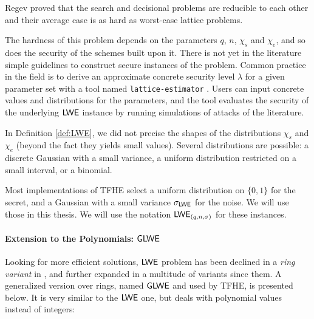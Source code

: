 Regev proved that the search and decisional problems are reducible to each other and their average case is as hard as worst-case lattice problems.

The hardness of this problem depends on the parameters $q$, $n$, $\chi_s$ and $\chi_e$, and so does the security of the schemes built upon it. There is not yet in the literature simple guidelines to construct secure instances of the problem. Common practice in the field is to derive an approximate concrete security level $\lambda$ for a given parameter set with a tool named \texttt{lattice-estimator} \cite{lattice-estimator}. Users can input concrete values and distributions for the parameters, and the tool evaluates the security of the underlying $\textsf{LWE}$ instance by running simulations of attacks of the literature.

In Definition \ref{def:LWE}, we did not precise the shapes of the distributions $\chi_s$ and $\chi_e$ (beyond the fact they yields small values). Several distributions are possible: a discrete Gaussian with a small variance, a uniform distribution restricted on a small interval, or a binomial. 

Most implementations of TFHE select a uniform distribution on $\{0, 1\}$ for the secret, and a Gaussian with a small variance $\sigma_{\textsf{LWE}}$ for the noise. We will use those in this thesis. We will use the notation $\textsf{LWE}_{(q, n, \sigma)}$ for these instances.



\paragraph{Extension to the Polynomials: $\textsf{GLWE}$}


Looking for more efficient solutions, $\textsf{LWE}$ problem has been declined in a \textit{ring variant} in \cite{rlwe}, and further expanded in a multitude of variants since them. A generalized version over rings, named $\textsf{GLWE}$ and used by TFHE, is presented below. It is very similar to the $\textsf{LWE}$ one, but deals with polynomial values instead of integers:

